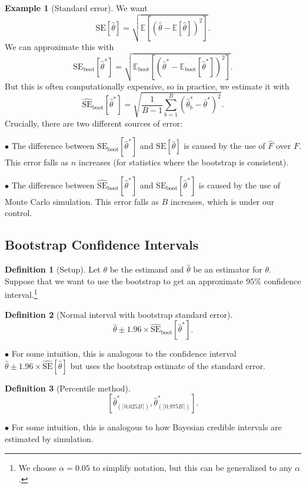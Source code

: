 \documentclass[12pt,oneside]{article}
\newcommand{\E}{\mathbb{E}}
\newcommand{\SE}{\text{SE}}
\newcommand{\boot}{\text{boot}}
\theoremstyle{definition}
\newtheorem{definition}{Definition}
\newtheorem{example}{Example}
\theoremstyle{remark}
\begin{document}
\begin{example}[Standard error]
We want \[\SE[\hat{\theta}] = \sqrt{\E[(\hat{\theta} - \E[\hat{\theta}])^2]}.\] We can approximate this with \[\SE_{\boot}[\hat{\theta}^*] = \sqrt{\E_{\boot}[(\hat{\theta}^* - \E_{\boot}[\hat{\theta}^*])^2]}.\] But this is often computationally expensive, so in practice, we estimate it with \[\widehat{\SE}_{\boot}[\hat{\theta}^*] = \sqrt{\frac{1}{B - 1} \sum_{b = 1}^{B} (\hat{\theta}^*_b - \bar{\theta}^*)^2}.\] Crucially, there are two different sources of error:

$\bullet$ The difference between $\SE_{\boot}[\hat{\theta}^*]$ and $\SE[\hat{\theta}]$ is caused by the use of $\hat{F}$ over $F$. This error falls as $n$ increases (for statistics where the bootstrap is consistent).

$\bullet$ The difference between $\widehat{\SE}_{\boot}[\hat{\theta}^*]$ and $\SE_{\boot}[\hat{\theta}^*]$ is caused by the use of Monte Carlo simulation. This error falls as $B$ increases, which is under our control.
\end{example}

\subsection{Bootstrap Confidence Intervals}

\begin{definition}[Setup]
Let $\theta$ be the estimand and $\hat{\theta}$ be an estimator for $\theta$. Suppose that we want to use the bootstrap to get an approximate $95\%$ confidence interval.\footnote{We choose $\alpha = 0.05$ to simplify notation, but this can be generalized to any $\alpha$.}
\end{definition}

\begin{definition}[Normal interval with bootstrap standard error]
\[\hat{\theta} \pm 1.96 \times \widehat{\SE}_{\boot}[\hat{\theta}^*].\]

$\bullet$ For some intuition, this is analogous to the confidence interval $\hat{\theta} \pm 1.96 \times \widehat{\SE}[\hat{\theta}]$ but uses the bootstrap estimate of the standard error.
\end{definition}

\begin{definition}[Percentile method]
\[\left[ \hat{\theta}^*_{(\lceil 0.025B \rceil)}, \hat{\theta}^*_{(\lceil 0.975B \rceil)} \right].\]

$\bullet$ For some intuition, this is analogous to how Bayesian credible intervals are estimated by simulation.
\end{definition}
\end{document}
